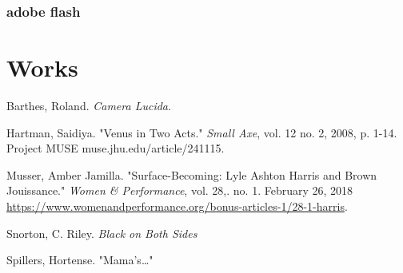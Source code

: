 \documentclass[11pt]{article}
\begin{document}
\subsubsection{adobe flash}
\label{sec:orgb866fc7}

\section{Works}
\label{sec:orgdd62b33}
Barthes, Roland. \emph{Camera Lucida}.

Hartman, Saidiya. "Venus in Two Acts." \emph{Small Axe}, vol. 12 no. 2,
   2008, p. 1-14. Project MUSE muse.jhu.edu/article/241115.

Musser, Amber Jamilla. "Surface-Becoming: Lyle Ashton Harris and Brown
  Jouissance." \emph{Women \& Performance}, vol. 28,. no. 1. February 26, 2018
  \url{https://www.womenandperformance.org/bonus-articles-1/28-1-harris}. 

Snorton, C. Riley. \emph{Black on Both Sides}

Spillers, Hortense. "Mama's\ldots{}"
\end{document}
